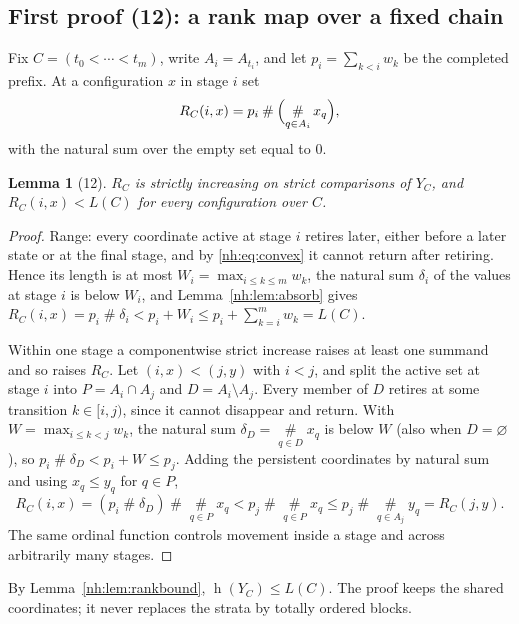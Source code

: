 \documentclass[11pt,a4paper]{article}
\newtheorem{lemma}[theorem]{Lemma}
\theoremstyle{definition}
\theoremstyle{remark}
\newcommand{\hgt}{\operatorname{h}}
\newcommand{\ns}{\mathbin{\#}}
\newcommand{\bigns}{\mathop{\#}\limits}
\begin{document}
\subsection{First proof (12): a rank map over a fixed chain}

Fix $C=(t_0<\cdots<t_m)$, write $A_i=A_{t_i}$, and let $p_i=\sum_{k<i}w_k$ be
the completed prefix. At a configuration $x$ in stage $i$ set
\begin{equation}\label{nh:eq:R}
 R_C(i,x)=p_i\ns\Bigl(\bigns_{q\in A_i}x_q\Bigr),
\end{equation}
with the natural sum over the empty set equal to $0$.

\begin{lemma}[12]\label{nh:lem:fixedupper}
$R_C$ is strictly increasing on strict comparisons of $Y_C$, and
$R_C(i,x)<L(C)$ for every configuration over $C$.
\end{lemma}
\begin{proof}
Range: every coordinate active at stage $i$ retires later, either before a
later state or at the final stage, and by \eqref{nh:eq:convex} it cannot
return after retiring. Hence its length is at most $W_i=\max_{i\le k\le m}w_k$,
the natural sum $\delta_i$ of the values at stage $i$ is below $W_i$, and
Lemma~\ref{nh:lem:absorb} gives
$R_C(i,x)=p_i\ns\delta_i<p_i+W_i\le p_i+\sum_{k=i}^mw_k=L(C)$.

Within one stage a componentwise strict increase raises at least one summand
and so raises $R_C$. Let $(i,x)<(j,y)$ with $i<j$, and split the active set
at stage $i$ into $P=A_i\cap A_j$ and $D=A_i\setminus A_j$. Every member of
$D$ retires at some transition $k\in[i,j)$, since it cannot disappear and
return. With $W=\max_{i\le k<j}w_k$, the natural sum
$\delta_D=\bigns_{q\in D}x_q$ is below $W$ (also when $D=\varnothing$), so
$p_i\ns\delta_D<p_i+W\le p_j$. Adding the persistent coordinates by natural
sum and using $x_q\le y_q$ for $q\in P$,
\[
 R_C(i,x)=(p_i\ns\delta_D)\ns\bigns_{q\in P}x_q
 <p_j\ns\bigns_{q\in P}x_q\le p_j\ns\bigns_{q\in A_j}y_q=R_C(j,y).
\]
The same ordinal function controls movement inside a stage and across
arbitrarily many stages.
\end{proof}

By Lemma~\ref{nh:lem:rankbound}, $\hgt(Y_C)\le L(C)$. The proof keeps the
shared coordinates; it never replaces the strata by totally ordered blocks.
\end{document}
